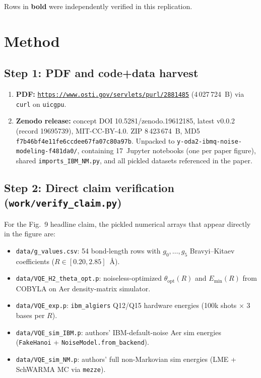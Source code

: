 \documentclass[11pt]{article}
\begin{document}
Rows in \textbf{bold} were independently verified in this replication.

\section{Method}
\label{sec:method}

\subsection{Step 1: PDF and code+data harvest}
\begin{enumerate}
  \item \textbf{PDF:} \href{https://www.osti.gov/servlets/purl/2881485}{\texttt{https://www.osti.gov/servlets/purl/2881485}} (4\,027\,724~B) via \texttt{curl} on \texttt{uicgpu}.
  \item \textbf{Zenodo release:} concept DOI 10.5281/zenodo.19612185, latest v0.0.2 (record 19695739), MIT-CC-BY-4.0. ZIP 8\,423\,674~B, MD5 \texttt{f7b46bf4e11fe6ccdee67fa07c80a97b}. Unpacked to \texttt{y-oda2-ibmq-noise-modeling-f481da0/}, containing 17~Jupyter notebooks (one per paper figure), shared \texttt{imports\_IBM\_NM.py}, and all pickled datasets referenced in the paper.
\end{enumerate}

\subsection{Step 2: Direct claim verification (\texttt{work/verify\_claim.py})}
For the Fig.~9 headline claim, the pickled numerical arrays that appear directly in the figure are:
\begin{itemize}
  \item \texttt{data/g\_values.csv}: 54 bond-length rows with $g_0,\dots,g_5$ Bravyi--Kitaev coefficients ($R \in [0.20, 2.85]$~\si{\angstrom}).
  \item \texttt{data/VQE\_H2\_theta\_opt.p}: noiseless-optimized $\theta_{\mathrm{opt}}(R)$ and $E_{\min}(R)$ from COBYLA on Aer density-matrix simulator.
  \item \texttt{data/VQE\_exp.p}: \texttt{ibm\_algiers} Q12/Q15 hardware energies (100k shots $\times$ 3 bases per $R$).
  \item \texttt{data/VQE\_sim\_IBM.p}: authors' IBM-default-noise Aer sim energies (\texttt{FakeHanoi} + \texttt{NoiseModel.from\_backend}).
  \item \texttt{data/VQE\_sim\_NM.p}: authors' full non-Markovian sim energies (LME + SchWARMA MC via \texttt{mezze}).
\end{itemize}
\end{document}

